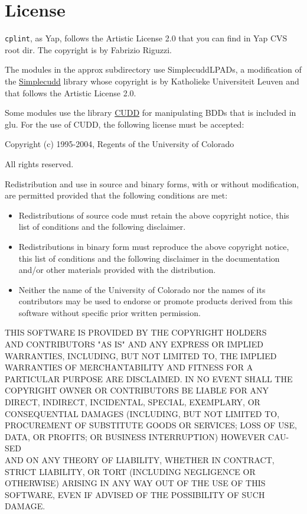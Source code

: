 \documentclass[a4paper,10pt]{scrartcl}
\begin{document}
\section{License}
\label{license}



\texttt{cplint}, as Yap, follows the Artistic License 2.0 that you can find in Yap CVS root dir. The copyright is by Fabrizio Riguzzi.
\vspace{3mm}

The modules in the approx subdirectory use SimplecuddLPADs, a modification of the \href{http://dtai.cs.kuleuven.be/problog/download.html}{Simplecudd} library whose copyright is by Katholieke Universiteit Leuven  and that follows the Artistic License 2.0.
\vspace{3mm}

Some modules use the library \href{http://vlsi.colorado.edu/\string ~fabio/}{CUDD} for manipulating BDDs that is included in glu.
For the use of CUDD, the following license must be accepted:

\vspace{3mm}

Copyright (c) 1995-2004, Regents of the University of Colorado

All rights reserved.

Redistribution and use in source and binary forms, with or without
modification, are permitted provided that the following conditions
are met:

\begin{itemize}
\item
Redistributions of source code must retain the above copyright
notice, this list of conditions and the following disclaimer.
\item
Redistributions in binary form must reproduce the above copyright
notice, this list of conditions and the following disclaimer in the
documentation and/or other materials provided with the distribution.
\item
Neither the name of the University of Colorado nor the names of its
contributors may be used to endorse or promote products derived from
this software without specific prior written permission.
\end{itemize}
THIS SOFTWARE IS PROVIDED BY THE COPYRIGHT HOLDERS \\ AND CONTRIBUTORS
"AS IS" AND ANY EXPRESS OR IMPLIED WARRANTIES, INCLUDING, BUT NOT
LIMITED TO, THE IMPLIED WARRANTIES OF MERCHANTABILITY AND FITNESS
FOR A PARTICULAR PURPOSE ARE DISCLAIMED. IN NO EVENT SHALL THE
COPYRIGHT OWNER OR CONTRIBUTORS BE LIABLE FOR ANY DIRECT, INDIRECT,
INCIDENTAL, SPECIAL, EXEMPLARY, OR CONSEQUENTIAL DAMAGES (INCLUDING,
BUT NOT LIMITED TO, PROCUREMENT OF SUBSTITUTE GOODS OR SERVICES;
LOSS OF USE, DATA, OR PROFITS; OR BUSINESS INTERRUPTION) HOWEVER
CAU-SED
\\ AND ON ANY THEORY OF LIABILITY, WHETHER IN CONTRACT, STRICT
LIABILITY, OR TORT (INCLUDING NEGLIGENCE OR OTHERWISE) ARISING IN
ANY WAY OUT OF THE USE OF THIS SOFTWARE, EVEN IF ADVISED OF THE
POSSIBILITY OF SUCH DAMAGE.
\end{document}
